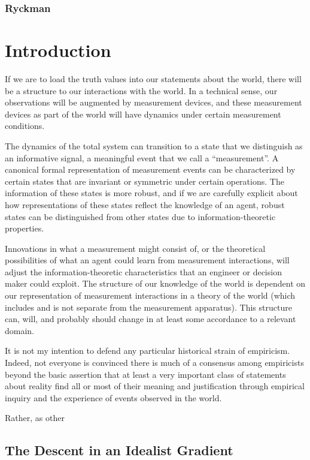 \documentclass{article}
\begin{document}
\subsubsection{Ryckman}

\section{Introduction}

If we are to load the truth values into our statements about the world, there will be a structure to our interactions with the world. In a technical sense, our observations will be augmented by measurement devices, and these measurement devices as part of the world will have dynamics under certain measurement conditions.  

The dynamics of the total system can transition to a state that we distinguish as an informative signal, a meaningful event that we call a ``measurement''.  A canonical formal representation of measurement events can be characterized by certain states that are invariant or symmetric under certain operations.  The information of these states is more robust, and if we are carefully explicit about how representations of these states reflect the knowledge of an agent, robust states can be distinguished from other states due to information-theoretic properties.

Innovations in what a measurement might consist of, or the theoretical possibilities of what an agent could learn from measurement interactions, will adjust the information-theoretic characteristics that an engineer or decision maker could exploit.  The structure of our knowledge of the world is dependent on our representation of measurement interactions in a theory of the world (which includes and is not separate from the measurement apparatus).  This structure can, will, and probably should change in at least some accordance to a relevant domain.

It is not my intention to defend any particular historical strain of empiricism.  Indeed, not everyone is convinced there is much of a consensus among empiricists beyond the basic assertion that at least a very important class of statements about reality find all or most of their meaning and justification through empirical inquiry and the experience of events observed in the world.  

Rather, as other

\subsection{The Descent in an Idealist Gradient}
\end{document}
